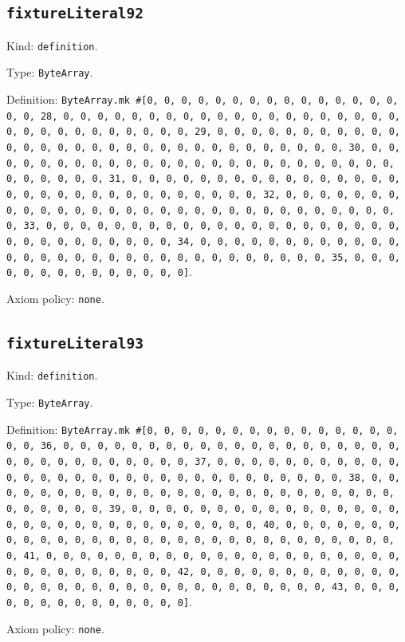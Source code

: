 \documentclass[11pt]{article}
\begin{document}
\subsection*{\texttt{fixtureLiteral92}}
\noindent Kind: \texttt{definition}.\par
\noindent Type: \texttt{ByteArray}.\par
\noindent Definition: \texttt{ByteArray.mk \#[0, 0, 0, 0, 0, 0, 0, 0, 0, 0, 0, 0, 0, 0, 0, 0, 0, 28, 0, 0, 0, 0, 0, 0, 0, 0, 0, 0, 0, 0, 0, 0, 0, 0, 0, 0, 0, 0, 0, 0, 0, 0, 0, 0, 0, 0, 0, 0, 0, 29, 0, 0, 0, 0, 0, 0, 0, 0, 0, 0, 0, 0, 0, 0, 0, 0, 0, 0, 0, 0, 0, 0, 0, 0, 0, 0, 0, 0, 0, 0, 0, 30, 0, 0, 0, 0, 0, 0, 0, 0, 0, 0, 0, 0, 0, 0, 0, 0, 0, 0, 0, 0, 0, 0, 0, 0, 0, 0, 0, 0, 0, 0, 0, 31, 0, 0, 0, 0, 0, 0, 0, 0, 0, 0, 0, 0, 0, 0, 0, 0, 0, 0, 0, 0, 0, 0, 0, 0, 0, 0, 0, 0, 0, 0, 0, 32, 0, 0, 0, 0, 0, 0, 0, 0, 0, 0, 0, 0, 0, 0, 0, 0, 0, 0, 0, 0, 0, 0, 0, 0, 0, 0, 0, 0, 0, 0, 0, 33, 0, 0, 0, 0, 0, 0, 0, 0, 0, 0, 0, 0, 0, 0, 0, 0, 0, 0, 0, 0, 0, 0, 0, 0, 0, 0, 0, 0, 0, 0, 0, 34, 0, 0, 0, 0, 0, 0, 0, 0, 0, 0, 0, 0, 0, 0, 0, 0, 0, 0, 0, 0, 0, 0, 0, 0, 0, 0, 0, 0, 0, 0, 0, 35, 0, 0, 0, 0, 0, 0, 0, 0, 0, 0, 0, 0, 0, 0]}.\par
\noindent Axiom policy: \texttt{none}.\par
\subsection*{\texttt{fixtureLiteral93}}
\noindent Kind: \texttt{definition}.\par
\noindent Type: \texttt{ByteArray}.\par
\noindent Definition: \texttt{ByteArray.mk \#[0, 0, 0, 0, 0, 0, 0, 0, 0, 0, 0, 0, 0, 0, 0, 0, 0, 36, 0, 0, 0, 0, 0, 0, 0, 0, 0, 0, 0, 0, 0, 0, 0, 0, 0, 0, 0, 0, 0, 0, 0, 0, 0, 0, 0, 0, 0, 0, 0, 37, 0, 0, 0, 0, 0, 0, 0, 0, 0, 0, 0, 0, 0, 0, 0, 0, 0, 0, 0, 0, 0, 0, 0, 0, 0, 0, 0, 0, 0, 0, 0, 38, 0, 0, 0, 0, 0, 0, 0, 0, 0, 0, 0, 0, 0, 0, 0, 0, 0, 0, 0, 0, 0, 0, 0, 0, 0, 0, 0, 0, 0, 0, 0, 39, 0, 0, 0, 0, 0, 0, 0, 0, 0, 0, 0, 0, 0, 0, 0, 0, 0, 0, 0, 0, 0, 0, 0, 0, 0, 0, 0, 0, 0, 0, 0, 40, 0, 0, 0, 0, 0, 0, 0, 0, 0, 0, 0, 0, 0, 0, 0, 0, 0, 0, 0, 0, 0, 0, 0, 0, 0, 0, 0, 0, 0, 0, 0, 41, 0, 0, 0, 0, 0, 0, 0, 0, 0, 0, 0, 0, 0, 0, 0, 0, 0, 0, 0, 0, 0, 0, 0, 0, 0, 0, 0, 0, 0, 0, 0, 42, 0, 0, 0, 0, 0, 0, 0, 0, 0, 0, 0, 0, 0, 0, 0, 0, 0, 0, 0, 0, 0, 0, 0, 0, 0, 0, 0, 0, 0, 0, 0, 43, 0, 0, 0, 0, 0, 0, 0, 0, 0, 0, 0, 0, 0, 0]}.\par
\noindent Axiom policy: \texttt{none}.\par
\end{document}
